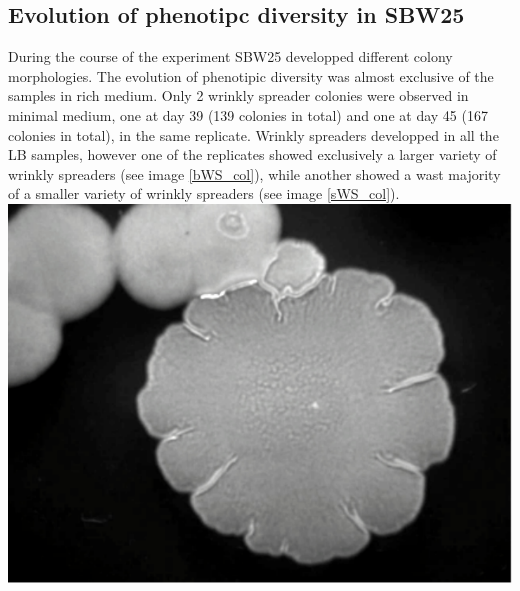\documentclass[
	11pt,
	a4paper,
]{article} %
\begin{document}
\begin{multicols}{2}
\subsection*{Evolution of phenotipc diversity in SBW25}
During the course of the experiment SBW25 developped different colony morphologies.
The evolution of phenotipic diversity was almost exclusive of the samples in rich medium.
Only 2 wrinkly spreader colonies were observed in minimal medium, one at day 39 (139 colonies in total) and one at day 45 (167 colonies in total), in the same replicate.
Wrinkly spreaders developped in all the LB samples, however one of the replicates showed exclusively a larger variety of wrinkly spreaders (see image \ref{bWS_col}), while another showed a wast majority of a smaller variety of wrinkly spreaders (see image \ref{sWS_col}).
\\[2ex]
\includegraphics[width=\columnwidth]{bWS_col.pdf}
\label{bWS_col}
\vspace{2ex}


\end{multicols}
\end{document}
